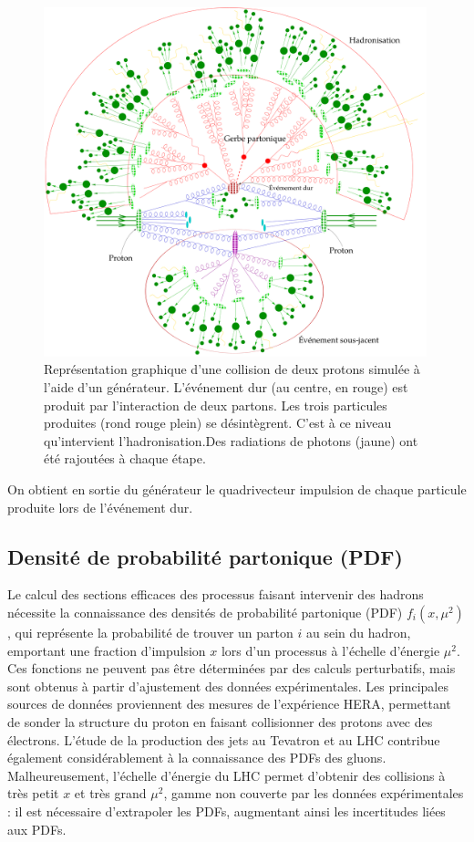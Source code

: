 \begin{figure}[tbp]
    \centering
    \includegraphics[width=0.99\textwidth]{chapitre3/figs/parton_shower_legend.pdf}
    \caption{Représentation graphique d'une collision de deux protons simulée à l'aide d'un générateur. L'événement dur (au centre, en rouge) est produit par l'interaction de deux partons. Les trois particules produites (rond rouge plein) se désintègrent. C'est à ce niveau qu'intervient l'hadronisation.Des radiations de photons (jaune) ont été rajoutées à chaque étape.}
    \label{fig:parton_shower}
\end{figure}

On obtient en sortie du générateur le quadrivecteur impulsion de chaque particule produite lors de l'événement dur.

\subsection{Densité de probabilité partonique (PDF)} \label{sec:pdf}

Le calcul des sections efficaces des processus faisant intervenir des hadrons nécessite la connaissance des densités de probabilité partonique (PDF) $f_i\left( x, \mu^2 \right)$, qui représente la probabilité de trouver un parton $i$ au sein du hadron, emportant une fraction d'impulsion $x$ lors d'un processus à l'échelle d'énergie $\mu^2$. Ces fonctions ne peuvent pas être déterminées par des calculs perturbatifs, mais sont obtenus à partir d'ajustement des données expérimentales. Les principales sources de données proviennent des mesures de l'expérience HERA, permettant de sonder la structure du proton en faisant collisionner des protons avec des électrons. L'étude de la production des jets au Tevatron et au LHC contribue également considérablement à la connaissance des PDFs des gluons. Malheureusement, l'échelle d'énergie du LHC permet d'obtenir des collisions à très petit $x$ et très grand $\mu^2$, gamme non couverte par les données expérimentales : il est nécessaire d'extrapoler les PDFs, augmentant ainsi les incertitudes liées aux PDFs.

